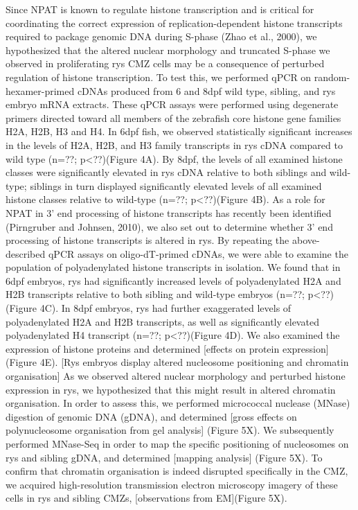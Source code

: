 Since NPAT is known to regulate histone transcription and is critical for coordinating the correct expression of replication-dependent histone transcripts required to package genomic DNA during S-phase (Zhao et al., 2000), we hypothesized that the altered nuclear morphology and truncated S-phase we observed in proliferating rys CMZ cells may be a consequence of perturbed regulation of histone transcription. To test this, we performed qPCR on random-hexamer-primed cDNAs produced from 6 and 8dpf wild type, sibling, and rys embryo mRNA extracts. These qPCR assays were performed using degenerate primers directed toward all members of the zebrafish core histone gene families H2A, H2B, H3 and H4. In 6dpf fish, we observed statistically significant increases in the levels of H2A, H2B, and H3 family transcripts in rys cDNA compared to wild type (n=??; p<??)(Figure 4A). By 8dpf, the levels of all examined histone classes were significantly elevated in rys cDNA relative to both siblings and wild-type; siblings in turn displayed significantly elevated levels of all examined histone classes relative to wild-type (n=??; p<??)(Figure 4B). As a role for NPAT in 3’ end processing of histone transcripts has recently been identified (Pirngruber and Johnsen, 2010), we also set out to determine whether 3’ end processing of histone transcripts is altered in rys. By repeating the above-described qPCR assays on oligo-dT-primed cDNAs, we were able to examine the population of polyadenylated histone transcripts in isolation. We found that in 6dpf embryos, rys had significantly increased levels of polyadenylated H2A and H2B transcripts relative to both sibling and wild-type embryos (n=??; p<??)(Figure 4C). In 8dpf embryos, rys had further exaggerated levels of polyadenylated H2A and H2B transcripts, as well as significantly elevated polyadenylated H4 transcript (n=??; p<??)(Figure 4D). We also examined the expression of histone proteins and determined [effects on protein expression](Figure 4E).
[Rys embryos display altered nucleosome positioning and chromatin organisation]
As we observed altered nuclear morphology and perturbed histone expression in rys, we hypothesized that this might result in altered chromatin organisation. In order to assess this, we performed micrococcal nuclease (MNase) digestion of genomic DNA (gDNA), and determined [gross effects on polynucleosome organisation from gel analysis] (Figure 5X). We subsequently performed MNase-Seq in order to map the specific positioning of nucleosomes on rys and sibling gDNA, and determined [mapping analysis] (Figure 5X). To confirm that chromatin organisation is indeed disrupted specifically in the CMZ, we acquired high-resolution transmission electron microscopy imagery of these cells in rys and sibling CMZs, [observations from EM](Figure 5X).

